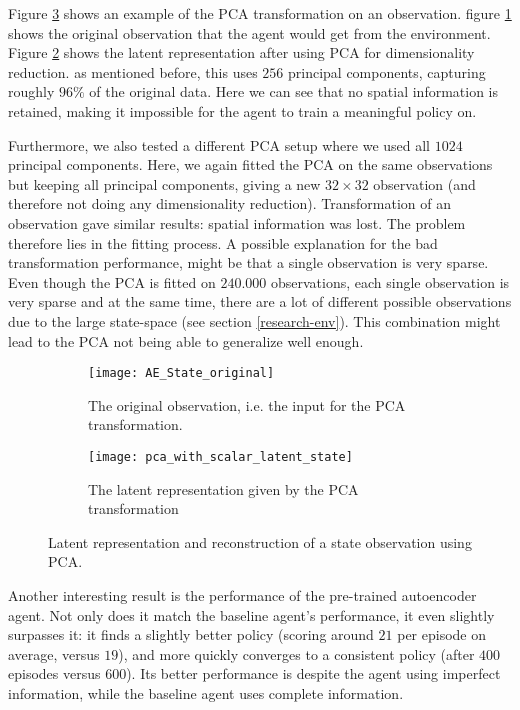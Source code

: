 Figure \ref{fig:pca-state} shows an example of the PCA transformation on an observation. figure \ref{fig:pca-original} shows the original observation that the agent would get from the environment. Figure \ref{fig:pca-latent} shows the latent representation after using PCA for dimensionality reduction. as mentioned before, this uses $256$ principal components, capturing roughly $96\%$ of the original data. Here we can see that no spatial information is retained, making it impossible for the agent to train a meaningful policy on. 

Furthermore, we also tested a different PCA setup where we used all $1024$ principal components. Here, we again fitted the PCA on the same observations but keeping all principal components, giving a new $32 \times 32$ observation (and therefore not doing any dimensionality reduction). Transformation of an observation gave similar results: spatial information was lost. The problem therefore lies in the fitting process. A possible explanation for the bad transformation performance, might be that a single observation is very sparse. Even though the PCA is fitted on $240.000$ observations, each single observation is very sparse and at the same time, there are a lot of different possible observations due to the large state-space (see section \ref{research-env}). This combination might lead to the PCA not being able to generalize well enough. 

\begin{figure}[h]
	\centering
	\begin{subfigure}[b]{0.75\textwidth}
		\texttt{[image: AE\_State\_original]}
		\caption{The original observation, i.e. the input for the PCA transformation.}
		\label{fig:pca-original} 
	\end{subfigure}
	\begin{subfigure}[b]{0.75\textwidth}
		\texttt{[image: pca\_with\_scalar\_latent\_state]}
		\caption{The latent representation given by the PCA transformation}
		\label{fig:pca-latent}
	\end{subfigure}
	\caption{Latent representation and reconstruction of a state observation using PCA.}
	\label{fig:pca-state}
\end{figure}

Another interesting result is the performance of the pre-trained autoencoder agent. Not only does it match the baseline agent's performance, it even slightly surpasses it: it finds a slightly better policy (scoring around $21$ per episode on average, versus $19$), and more quickly converges to a consistent policy (after $400$ episodes versus $600$). Its better performance is despite the agent using imperfect information, while the baseline agent uses complete information.

